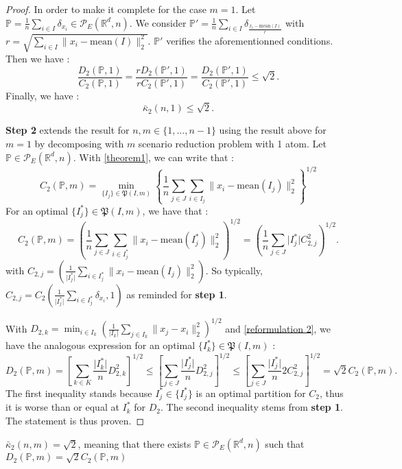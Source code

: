 \documentclass{amsart}
\newcommand{\RR}{\mathbb{R}}
\begin{document}
\begin{proof}
In order to make it complete for the case $m=1$. Let $\mathbb{P}=\frac{1}{n}\sum_{i\in I}\delta_{x_i}\in\mathcal{P}_E\left(\RR^d,n\right)$. We consider $\mathbb{P}'=\frac{1}{n}\sum_{i\in I}\delta_{\frac{x_i-\text{mean}(I)}{r}}$ with $r=\sqrt{\sum_{i\in I}\rVert x_i-\text{mean}(I)\lVert^2_2}$. $\mathbb{P}'$ verifies the aforementionned conditions. Then we have : 
$$
\frac{D_2\left(\mathbb{P},1\right)}{C_2\left(\mathbb{P},1\right)}=\frac{rD_2\left(\mathbb{P}',1\right)}{rC_2\left(\mathbb{P}',1\right)}=\frac{D_2\left(\mathbb{P}',1\right)}{C_2\left(\mathbb{P}',1\right)}\leq \sqrt{2}.
$$
Finally, we have : $$\bar\kappa_2\left(n,1\right)\leq\sqrt{2}.$$
\newline

\textbf{Step 2} extends the result for $n,m\in\{1,...,n-1\}$ using the result above for $m=1$ by decomposing with $m$ scenario reduction problem with 1 atom. Let $\mathbb{P}\in\mathcal{P}_E\left(\RR^d,n\right). $ With \ref{theorem1}, we can write that :
$$
C_2\left(\mathbb{P},m\right)=\min_{\{I_j\}\in \mathfrak{P}(I,m)}\left\{ \frac{1}{n}\sum_{j\in J}\sum_{i\in I_j}\lVert x_i-\text{mean}\left(I_j\right)\rVert^2_2 \right\}^{1/2}
$$
For an optimal $\{I_j^*\}\in\mathfrak{P}\left(I,m\right)$, we have that :
$$
C_2\left(\mathbb{P},m\right)=\left(\frac{1}{n}\sum_{j\in J}\sum_{i\in I_j^*} \lVert x_i-\text{mean}\left(I_j^*\right)\rVert^2_2\right)^{1/2}=\left(\frac{1}{n}\sum_{j\in J}\lvert I_j^*\rvert C^2_{2,j}\right)^{1/2}.
$$
with $C_{2,j}=\left(\frac{1}{\lvert I_j^*\rvert}\sum_{i\in I_j^*}\lVert x_i -\text{mean}\left(I_j\right)\rVert^2_2\right)$. So typically,  $C_{2,j}=C_2\left(\frac{1}{\lvert I_j^*\rvert}\sum_{i\in I_j^*}\delta_{x_i},1\right)$ as reminded for \textbf{step 1}.

With $D_{2,k}=\min_{i\in I_k}\left(\frac{1}{\lvert I_k\rvert}\sum_{j\in I_k}\lVert x_j -x_i\rVert^2_2\right)^{1/2}$ and \ref{reformulation 2}, we have the analogous expression for an optimal $\{I_k^*\}\in\mathfrak{P}\left(I,m\right)$ : 
$$
D_2\left(\mathbb{P},m\right)=\left[ \sum_{k\in K}\frac{\lvert I_k^*\rvert}{n}D_{2,k}^2\right]^{1/2}\leq \left[ \sum_{j\in J}\frac{\lvert I_j^*\rvert}{n}D_{2,j}^2\right]^{1/2}\leq \left[ \sum_{j\in J}\frac{\lvert I_j^*\rvert}{n}2C_{2,j}^2\right]^{1/2}=\sqrt{2}C_2\left(\mathbb{P},m\right).
$$
The first inequality stands because $I_j^*\in\{I_j^*\}$ is an optimal partition for $C_2$, thus it is worse than or equal at $I_k^*$ for $D_2$. The second inequality stems from \textbf{step 1}. The statement is thus proven.
\end{proof}
\begin{proposition}
    $\bar\kappa_2\left(n,m\right)=\sqrt{2}$, meaning that there exists $\mathbb{P}\in\mathcal{P}_E\left(\RR^d,n\right)$ such that $D_2\left(\mathbb{P},m\right)=\sqrt{2}C_2\left(\mathbb{P},m\right)$
\end{proposition}
\end{document}
